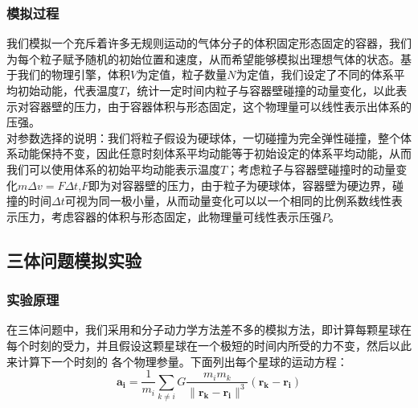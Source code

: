 ﻿\documentclass{article}
\begin{document}
	\subsubsection*{模拟过程}
	我们模拟一个充斥着许多无规则运动的气体分子的体积固定形态固定的容器，我们为每个粒子赋予随机的初始位置和速度，从而希望能够模拟出理想气体的状态。基于我们的物理引擎，体积$V$为定值，粒子数量$N$为定值，我们设定了不同的体系平均初始动能，代表温度$T$，统计一定时间内粒子与容器壁碰撞的动量变化，以此表示对容器壁的压力，由于容器体积与形态固定，这个物理量可以线性表示出体系的压强。\\
	对参数选择的说明：我们将粒子假设为硬球体，一切碰撞为完全弹性碰撞，整个体系动能保持不变，因此任意时刻体系平均动能等于初始设定的体系平均动能，从而我们可以使用体系的初始平均动能表示温度$T$；考虑粒子与容器壁碰撞时的动量变化$m \Delta v = F \Delta t$,$F$即为对容器壁的压力，由于粒子为硬球体，容器壁为硬边界，碰撞的时间$\Delta t$可视为同一极小量，从而动量变化可以以一个相同的比例系数线性表示压力，考虑容器的体积与形态固定，此物理量可线性表示压强$P$。
	\begin{figure}[H]
		\centering
	\end{figure}
	\subsection{三体问题模拟实验}
	\subsubsection{实验原理}
	在三体问题中，我们采用和分子动力学方法差不多的模拟方法，即计算每颗星球在每个时刻的受力，并且假设这颗星球在一个极短的时间内所受的力不变，然后以此来计算下一个时刻的
	各个物理参量。下面列出每个星球的运动方程：
	\[\mathbf{a_i} = \frac{1}{m_i}\sum_{k \neq i} G\frac{m_im_k}{\lVert \mathbf{r_k} - \mathbf{r_i} \rVert^3}(\mathbf{r_k} - \mathbf{r_i})\]
\end{document}

